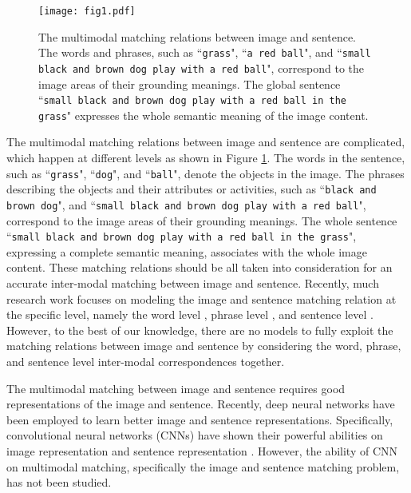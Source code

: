 \documentclass[10pt,twocolumn,letterpaper]{article}
\begin{document}
\begin{figure}[t]
\begin{center}
\texttt{[image: fig1.pdf]}

\end{center}
   \caption{The multimodal matching relations between image and sentence. The words and phrases, such as ``\texttt{\small grass}", ``\texttt{\small a red ball}", and ``\texttt{\small small black and brown dog play with a red ball}", correspond to the image areas of their grounding meanings. The global sentence ``\texttt{\small small black and brown dog play with a red ball in the grass}" expresses the whole semantic meaning of the image content.}
\label{fig1}
\end{figure}




The multimodal matching relations between image and sentence are complicated, which happen at different levels as shown in Figure \ref{fig1}. The words in the sentence, such as ``\texttt{\small grass}", ``\texttt{\small dog}", and ``\texttt{\small ball}", denote the objects in the image. The phrases describing the objects and their attributes or activities, such as ``\texttt{\small black and brown dog}", and ``\texttt{\small small black and brown dog play with a red ball}", correspond to the image areas of their grounding meanings. The whole sentence ``\texttt{\small small black and brown dog play with a red ball in the grass}", expressing a complete semantic meaning, associates with the whole image content.  These matching relations should be all taken into consideration for an accurate inter-modal matching between image and sentence. Recently, much research work focuses on  modeling the image and sentence matching relation at the specific level, namely the word level \cite{nitish_icml2012,nitish_nips2012,frome_nips2013}, phrase level \cite{zitnick_iccv2013,sadeghi_cvpr2011}, and sentence level \cite{hodosh_jair2013, karpathy_2014, socher_tacl2014}. However, to the best of our knowledge, there are no models to fully exploit the matching relations between image and sentence by considering the word, phrase, and sentence level inter-modal correspondences together.




The multimodal matching between image and sentence requires good representations of the image and sentence. Recently, deep neural networks have been employed to learn better image and sentence representations. Specifically, convolutional neural networks (CNNs) have shown their powerful abilities on image representation \cite{he_eccv2014,simonyan_arxiv2014,szegedy_arxiv2014,he_arxiv2015} and sentence representation \cite{kalchbrenner_acl2014,ykim_emnlp2014}. However, the ability of CNN on multimodal matching, specifically the image and sentence matching problem, has not been studied.
\end{document}
